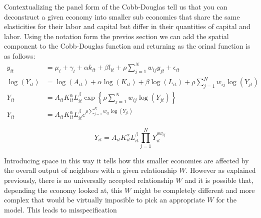 Contextualizing the panel form of the Cobb-Douglas tell us that you can deconstruct
a given economy into smaller sub economies that share the same elasticities for their labor
and capital but differ in their quantities of capital and labor. Using the notation form the
previos section we can add the spatial component to the Cobb-Douglas function and returning as the orinal function is as follows:
\[
	\begin{split}
		y_{it}       & = \mu_i + \gamma_t + \alpha k_{it} + \beta l_{it} + \rho \sum_{j=1}^N w_{ij} y_{jt} + \epsilon_{it} \\
		\log(Y_{it}) & = \log(A_{it}) + \alpha \log(K_{it}) + \beta \log(L_{it}) + \rho \sum_{j=1}^N w_{ij} \log(Y_{jt})   \\
		Y_{it}       & = A_{it} K^\alpha_{it} L^\beta_{it} \exp \left\{ \rho \sum_{j=1}^N w_{ij} \log(Y_{jt}) \right\}     \\
		Y_{it}       & = A_{it} K^\alpha_{it} L^\beta_{it} e^{\rho \sum_{j=1}^N w_{ij} \log(Y_{jt})}
	\end{split}
\]

\begin{equation}
	Y_{it} = A_{it} K^\alpha_{it} L^\beta_{it} \prod_{j=1}^N Y_{it}^{\rho w_{ij}}
\end{equation}

Introducing space in this way it tells how this smaller economies are affected by the
overall output of neighbors with a given relationship $W$. However as explained previously,
there is no universally accepted relationship $W$ and it is possible that, depending the
economy looked at, this $W$ might be completely different and more complex that would be virtually
imposible to pick an appropriate $W$ for the model. This leads to misspecification \cite{florax2003misspecification}
